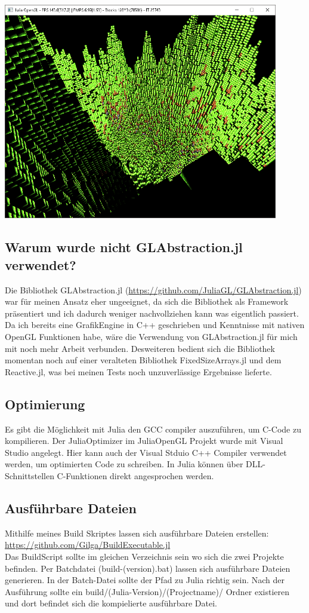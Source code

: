 \documentclass[11pt]{article}
\begin{document}
\begin{center}
\includegraphics[width=0.9\textwidth]{status2.png}
\end{center}

\subsection{Warum wurde nicht GLAbstraction.jl verwendet?}

Die Bibliothek GLAbstraction.jl (\url{https://github.com/JuliaGL/GLAbstraction.jl}) war für meinen Ansatz eher ungeeignet, da sich die Bibliothek als Framework präsentiert und ich dadurch weniger nachvollziehen kann was eigentlich passiert. Da ich bereits eine GrafikEngine in C++ geschrieben und Kenntnisse mit nativen OpenGL Funktionen habe, wäre die Verwendung von GLAbstraction.jl für mich mit noch mehr Arbeit verbunden. Desweiteren bedient sich die Bibliothek momentan noch auf einer veralteten Bibliothek FixedSizeArrays.jl und dem Reactive.jl, was bei meinen Tests noch unzuverlässige Ergebnisse lieferte.

\subsection{Optimierung}
Es gibt die Möglichkeit mit Julia den GCC compiler auszuführen, um C-Code zu kompilieren. Der JuliaOptimizer im JuliaOpenGL Projekt wurde mit Visual Studio angelegt. Hier kann auch der Visual Stduio C++ Compiler verwendet werden, um optimierten Code zu schreiben. In Julia können über DLL-Schnittstellen C-Funktionen direkt angesprochen werden.

\subsection{Ausf\"uhrbare Dateien}
Mithilfe meines Build Skriptes lassen sich ausführbare Dateien erstellen: \url{https://github.com/Gilga/BuildExecutable.jl}\\
Das BuildScript sollte im gleichen Verzeichnis sein wo sich die zwei Projekte befinden. Per Batchdatei (build-(version).bat) lassen sich ausführbare Dateien generieren. In der Batch-Datei sollte der Pfad zu Julia richtig sein. Nach der Ausführung sollte ein build/(Julia-Version)/(Projectname)/ Ordner existieren und dort befindet sich die kompielierte ausführbare Datei.
\end{document}
